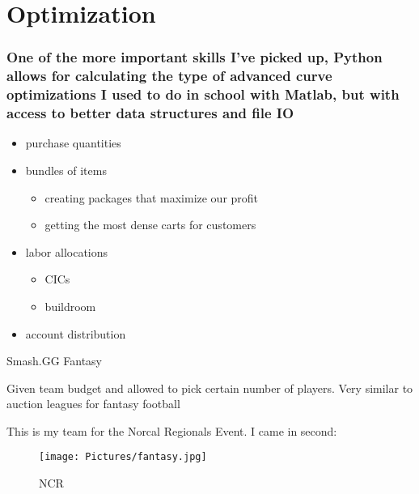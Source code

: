 \documentclass[11pt]{article}
\makeatletter
\def\maxwidth{\ifdim\Gin@nat@width>\linewidth\linewidth
    \else\Gin@nat@width\fi}
\let\Oldincludegraphics\includegraphics
\renewcommand{\includegraphics}[1]{\Oldincludegraphics[width=.8\maxwidth]{#1}}
\providecommand{\tightlist}{%
      \setlength{\itemsep}{0pt}\setlength{\parskip}{0pt}}
\makeatother
\begin{document}
    
    
    
    
    
    
    
    
    \section{Optimization}\label{optimization}

\subsubsection{One of the more important skills I've picked up, Python
allows for calculating the type of advanced curve optimizations I used
to do in school with Matlab, but with access to better data structures
and file
IO}\label{one-of-the-more-important-skills-ive-picked-up-python-allows-for-calculating-the-type-of-advanced-curve-optimizations-i-used-to-do-in-school-with-matlab-but-with-access-to-better-data-structures-and-file-io}

\begin{itemize}
\tightlist
\item
  purchase quantities
\item
  bundles of items

  \begin{itemize}
  \tightlist
  \item
    creating packages that maximize our profit
  \item
    getting the most dense carts for customers
  \end{itemize}
\item
  labor allocations

  \begin{itemize}
  \tightlist
  \item
    CICs
  \item
    buildroom
  \end{itemize}
\item
  account distribution
\end{itemize}

    Smash.GG Fantasy

Given team budget and allowed to pick certain number of players. Very
similar to auction leagues for fantasy football

This is my team for the Norcal Regionals Event. I came in second:

\begin{figure}
\centering
\texttt{[image: Pictures/fantasy.jpg]}
\caption{NCR}
\end{figure}
\end{document}
